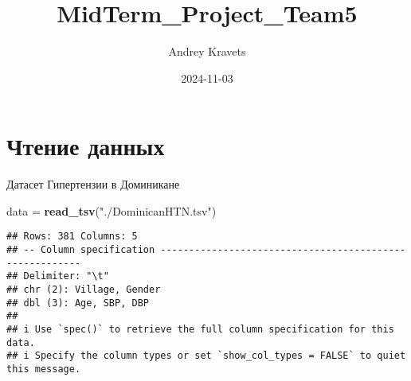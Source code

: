 \documentclass[
]{article}
\title{MidTerm\_Project\_Team5}
\author{Andrey Kravets}
\date{2024-11-03}
\newenvironment{Shaded}{\begin{snugshade}}{\end{snugshade}}
\newcommand{\FunctionTok}[1]{\textcolor[rgb]{0.13,0.29,0.53}{\textbf{#1}}}
\newcommand{\NormalTok}[1]{#1}
\newcommand{\OtherTok}[1]{\textcolor[rgb]{0.56,0.35,0.01}{#1}}
\newcommand{\StringTok}[1]{\textcolor[rgb]{0.31,0.60,0.02}{#1}}
\begin{document}
\maketitle

\section{Чтение
данных}\label{ux447ux442ux435ux43dux438ux435-ux434ux430ux43dux43dux44bux445}

Датасет Гипертензии в Доминикане

\begin{Shaded}
\begin{Highlighting}[]
\NormalTok{data }\OtherTok{=} \FunctionTok{read\_tsv}\NormalTok{(}\StringTok{"./DominicanHTN.tsv"}\NormalTok{)}
\end{Highlighting}
\end{Shaded}

\begin{verbatim}
## Rows: 381 Columns: 5
## -- Column specification --------------------------------------------------------
## Delimiter: "\t"
## chr (2): Village, Gender
## dbl (3): Age, SBP, DBP
## 
## i Use `spec()` to retrieve the full column specification for this data.
## i Specify the column types or set `show_col_types = FALSE` to quiet this message.
\end{verbatim}
\end{document}

